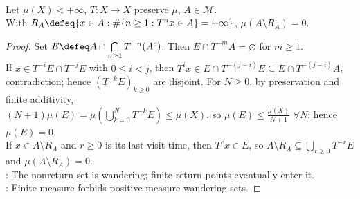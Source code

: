 \begin{theorem} \label{thm:poincare-recurrence-measure-preserving} \\
Let $\mu(X)<+\infty$, $T:X\to X$ preserve $\mu$, $A\in\mathcal{M}$.\\
With $R_A\defeq\{x\in A:\#\{n\geq1:T^nx\in A\}=+\infty\}$, $\mu(A\setminus R_A)=0$.
\begin{proof}
Set $E\defeq A\cap\bigcap\limits_{n\geq1}T^{-n}(A^c)$. Then $E\cap T^{-m}A=\varnothing$ for $m\geq1$.\\
If $x\in T^{-i}E\cap T^{-j}E$ with $0\leq i<j$, then $T^ix\in E\cap T^{-(j-i)}E\subseteq E\cap T^{-(j-i)}A$, contradiction; hence $(T^{-k}E)_{k\geq0}$ are disjoint. For $N\geq0$, by preservation and finite additivity,\\
$(N+1)\mu(E)=\mu(\bigcup\limits_{k=0}^NT^{-k}E)\leq\mu(X)$, so $\mu(E)\leq\frac{\mu(X)}{N+1}$ $\forall N$; hence $\mu(E)=0$.\\
If $x\in A\setminus R_A$ and $r\geq0$ is its last visit time, then $T^rx\in E$, so $A\setminus R_A\subseteq\bigcup\limits_{r\geq0}T^{-r}E$ and $\mu(A\setminus R_A)=0$.\\
: The nonreturn set is wandering; finite-return points eventually enter it.\\
: Finite measure forbids positive-measure wandering sets.
\end{proof}
\end{theorem}
